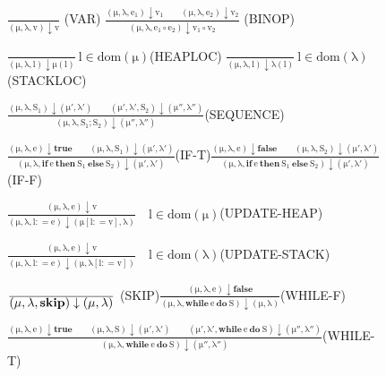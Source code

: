 \documentclass{llncs}
\begin{document}
\begin{figure*}[t]
\begin{minipage}[t]{6.8in}\scriptsize
$\mathrm{\frac{\displaystyle\ }{\displaystyle
(\mu,\lambda,v)\downarrow v}}$ \quad(VAR)\qquad
$\mathrm{\frac{\displaystyle (\mu,\lambda,e_1)\downarrow v_1\qquad
(\mu,\lambda,e_2)\downarrow v_2}{\displaystyle (\mu,\lambda,e_1
\circ e_2)\downarrow v_1\circ v_2}}$ \quad(BINOP)

$\mathrm{\frac{\displaystyle\ }{\displaystyle (\mu,\lambda,l)
\downarrow \mu(l)}\ l\in dom(\mu)}$\quad (HEAPLOC)\qquad
$\mathrm{\frac{\displaystyle\ }{\displaystyle (\mu,\lambda,l)
\downarrow \lambda(l)}\ l\in dom(\lambda)}$\quad (STACKLOC)

$\mathrm{\frac{\displaystyle(\mu,\lambda,S_1)\downarrow
(\mu',\lambda')\qquad (\mu',\lambda',S_2)\downarrow
(\mu'',\lambda'')}{\displaystyle (\mu,\lambda,S_1;S_2)\downarrow
(\mu'',\lambda'')}}$\quad(SEQUENCE)

$\mathrm{\frac{\displaystyle(\mu,\lambda,e)\downarrow
\textbf{true}\qquad (\mu,\lambda,S_1)\downarrow
(\mu',\lambda')}{\displaystyle(\mu,\lambda,\textbf{if}\ e\
\textbf{then}\ S_1\ \textbf{else}\ S_2)\downarrow
(\mu',\lambda')}}$\quad(IF-T)\qquad $\mathrm{\frac{\displaystyle
(\mu,\lambda,e)\downarrow \textbf{false}\qquad
(\mu,\lambda,S_2)\downarrow (\mu',\lambda')}{\displaystyle
(\mu,\lambda,\textbf{if}\ e\ \textbf{then}\ S_1\ \textbf{else}\
S_2)\downarrow (\mu',\lambda')}}$\quad(IF-F)

$\mathrm{\frac{\displaystyle(\mu,\lambda,e)\downarrow
v}{\displaystyle(\mu,\lambda,l\mathrel{\mathop:}= e)\downarrow
(\mu[l\mathrel{\mathop:}= v],\lambda)}\quad l\in
dom(\mu)}$\quad(UPDATE-HEAP)

$\mathrm{\frac{\displaystyle(\mu,\lambda,e)\downarrow
v}{\displaystyle(\mu,\lambda,l\mathrel{\mathop:}= e)\downarrow
(\mu,\lambda[l\mathrel{\mathop:}= v])}\quad l\in
dom(\lambda)}$\quad(UPDATE-STACK)

$\mathrm{\frac{\displaystyle}{\displaystyle(\mu,\lambda,\textbf{skip})\downarrow(\mu,\lambda)}}$\quad
(SKIP)\qquad $\mathrm{\frac{\displaystyle (\mu,\lambda,e)\downarrow
\textbf{false}}{\displaystyle (\mu,\lambda,\textbf{while}\ e\
\textbf{do}\ S)\downarrow (\mu,\lambda)}}$\quad(WHILE-F)

$\mathrm{\frac{\displaystyle (\mu,\lambda,e)\downarrow
\textbf{true}\qquad (\mu,\lambda,S)\downarrow
(\mu',\lambda')\qquad(\mu',\lambda',\textbf{while}\ e\ \textbf{do}\
S)\downarrow (\mu'',\lambda'')}{\displaystyle
(\mu,\lambda,\textbf{while}\ e\ \textbf{do}\ S)\downarrow
(\mu'',\lambda'')}}$\quad(WHILE-T)


\end{minipage}
\end{figure*}
\end{document}
